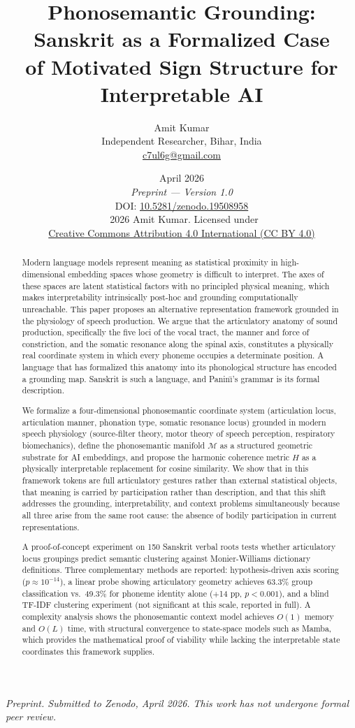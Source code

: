 \documentclass[12pt]{article}
\title{\textbf{Phonosemantic Grounding: Sanskrit as a Formalized Case\\
of Motivated Sign Structure for Interpretable AI}}
\author{Amit Kumar\\
\small Independent Researcher, Bihar, India\\
\small \href{mailto:c7ul6g@gmail.com}{c7ul6g@gmail.com}}
\date{%
  April 2026\\[4pt]
  \small\textit{Preprint — Version 1.0}\\[2pt]
  \small DOI: \href{https://doi.org/10.5281/zenodo.19508958}{10.5281/zenodo.19508958}\\[2pt]
  \small\textcopyright\ 2026 Amit Kumar. Licensed under\\
  \small\href{https://creativecommons.org/licenses/by/4.0/}{Creative Commons Attribution 4.0 International (CC BY 4.0)}%
}
\begin{document}
\maketitle

\begin{center}
\small\textit{Preprint. Submitted to Zenodo, April 2026. This work has not undergone formal peer review.}
\end{center}

\begin{abstract}
Modern language models represent meaning as statistical proximity in high-dimensional embedding spaces whose geometry is difficult to interpret. The axes of these spaces are latent statistical factors with no principled physical meaning, which makes interpretability intrinsically post-hoc and grounding computationally unreachable. This paper proposes an alternative representation framework grounded in the physiology of speech production. We argue that the articulatory anatomy of sound production, specifically the five loci of the vocal tract, the manner and force of constriction, and the somatic resonance along the spinal axis, constitutes a physically real coordinate system in which every phoneme occupies a determinate position. A language that has formalized this anatomy into its phonological structure has encoded a grounding map. Sanskrit is such a language, and Panin\={\i}'s grammar is its formal description.

We formalize a four-dimensional phonosemantic coordinate system (articulation locus, articulation manner, phonation type, somatic resonance locus) grounded in modern speech physiology (source-filter theory, motor theory of speech perception, respiratory biomechanics), define the phonosemantic manifold $\mathcal{M}$ as a structured geometric substrate for AI embeddings, and propose the harmonic coherence metric $H$ as a physically interpretable replacement for cosine similarity. We show that in this framework tokens are full articulatory gestures rather than external statistical objects, that meaning is carried by participation rather than description, and that this shift addresses the grounding, interpretability, and context problems simultaneously because all three arise from the same root cause: the absence of bodily participation in current representations.

A proof-of-concept experiment on 150 Sanskrit verbal roots tests whether articulatory locus groupings predict semantic clustering against Monier-Williams dictionary definitions. Three complementary methods are reported: hypothesis-driven axis scoring ($p \approx 10^{-14}$), a linear probe showing articulatory geometry achieves 63.3\% group classification vs.\ 49.3\% for phoneme identity alone ($+$14 pp, $p < 0.001$), and a blind TF-IDF clustering experiment (not significant at this scale, reported in full). A complexity analysis shows the phonosemantic context model achieves $O(1)$ memory and $O(L)$ time, with structural convergence to state-space models such as Mamba, which provides the mathematical proof of viability while lacking the interpretable state coordinates this framework supplies.


\end{abstract}
\end{document}

